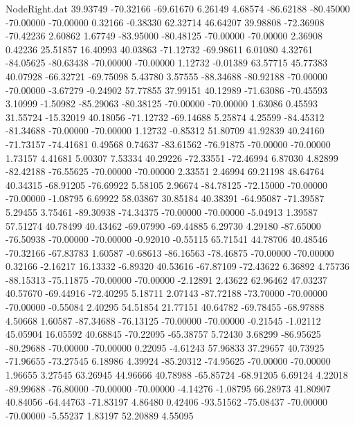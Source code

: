 \begin{filecontents}{NodeRight.dat}
  39.93749  -70.32166  -69.61670     6.26149    4.68574  -86.62188  -80.45000  -70.00000  -70.00000    0.32166   -0.38330   62.32714   46.64207
  39.98808  -72.36908  -70.42236     2.60862    1.67749  -83.95000  -80.48125  -70.00000  -70.00000    2.36908    0.42236   25.51857   16.40993
  40.03863  -71.12732  -69.98611     6.01080    4.32761  -84.05625  -80.63438  -70.00000  -70.00000    1.12732   -0.01389   63.57715   45.77383
  40.07928  -66.32721  -69.75098     5.43780    3.57555  -88.34688  -80.92188  -70.00000  -70.00000   -3.67279   -0.24902   57.77855   37.99151
  40.12989  -71.63086  -70.45593     3.10999   -1.50982  -85.29063  -80.38125  -70.00000  -70.00000    1.63086    0.45593   31.55724  -15.32019
  40.18056  -71.12732  -69.14688     5.25874    4.25599  -84.45312  -81.34688  -70.00000  -70.00000    1.12732   -0.85312   51.80709   41.92839
  40.24160  -71.73157  -74.41681     0.49568    0.74637  -83.61562  -76.91875  -70.00000  -70.00000    1.73157    4.41681    5.00307    7.53334
  40.29226  -72.33551  -72.46994     6.87030    4.82899  -82.42188  -76.55625  -70.00000  -70.00000    2.33551    2.46994   69.21198   48.64764
  40.34315  -68.91205  -76.69922     5.58105    2.96674  -84.78125  -72.15000  -70.00000  -70.00000   -1.08795    6.69922   58.03867   30.85184
  40.38391  -64.95087  -71.39587     5.29455    3.75461  -89.30938  -74.34375  -70.00000  -70.00000   -5.04913    1.39587   57.51274   40.78499
  40.43462  -69.07990  -69.44885     6.29730    4.29180  -87.65000  -76.50938  -70.00000  -70.00000   -0.92010   -0.55115   65.71541   44.78706
  40.48546  -70.32166  -67.83783     1.60587   -0.68613  -86.16563  -78.46875  -70.00000  -70.00000    0.32166   -2.16217   16.13332   -6.89320
  40.53616  -67.87109  -72.43622     6.36892    4.75736  -88.15313  -75.11875  -70.00000  -70.00000   -2.12891    2.43622   62.96462   47.03237
  40.57670  -69.44916  -72.40295     5.18711    2.07143  -87.72188  -73.70000  -70.00000  -70.00000   -0.55084    2.40295   54.51854   21.77151
  40.64782  -69.78455  -68.97888     4.50668    1.60587  -87.34688  -76.13125  -70.00000  -70.00000   -0.21545   -1.02112   45.05904   16.05592
  40.68845  -70.22095  -65.38757     5.72430    3.68299  -86.95625  -80.29688  -70.00000  -70.00000    0.22095   -4.61243   57.96833   37.29657
  40.73925  -71.96655  -73.27545     6.18986    4.39924  -85.20312  -74.95625  -70.00000  -70.00000    1.96655    3.27545   63.26945   44.96666
  40.78988  -65.85724  -68.91205     6.69124    4.22018  -89.99688  -76.80000  -70.00000  -70.00000   -4.14276   -1.08795   66.28973   41.80907
  40.84056  -64.44763  -71.83197     4.86480    0.42406  -93.51562  -75.08437  -70.00000  -70.00000   -5.55237    1.83197   52.20889    4.55095

\end{filecontents}
